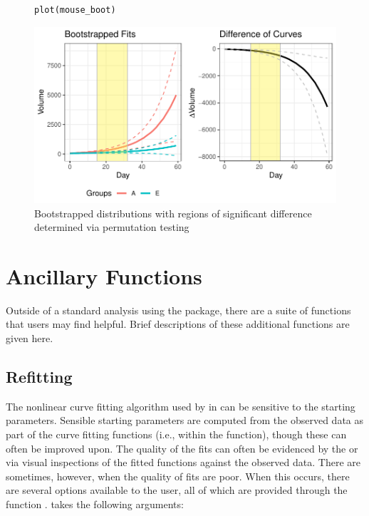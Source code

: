 \begin{figure}[H]
\centering
\begin{BVerbatim}
plot(mouse_boot)
\end{BVerbatim}

\includegraphics{img/mouse_boot_plot.pdf}
\caption{Bootstrapped distributions with regions of significant difference determined via permutation testing}
\end{figure}
%
%
%
%


\section{Ancillary Functions}\label{sec:anc_func}

Outside of a standard analysis using the  package, there are a suite of functions that users may find helpful. Brief descriptions of these additional functions are given here. 


\subsection{Refitting}

The nonlinear curve fitting algorithm used by  in  can be sensitive to the starting parameters. Sensible starting parameters are computed from the observed data as part of the curve fitting functions (i.e., within the  function), though these can often be improved upon. The quality of the fits can often be evidenced by the  or via  visual inspections of the fitted functions against the observed data. There are sometimes, however, when the quality of fits are poor. When this occurs, there are several options available to the user, all of which are provided through the function .  takes the following arguments:

